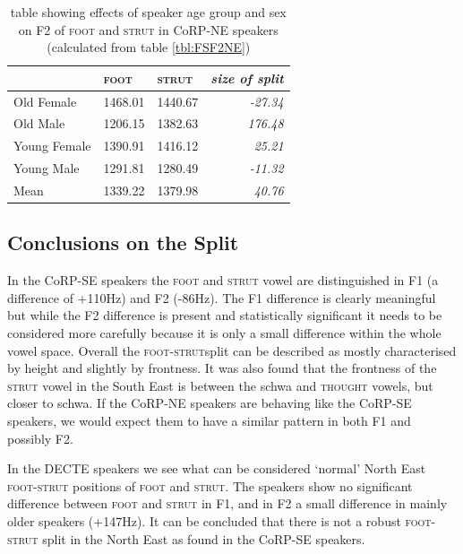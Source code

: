 \documentclass[12pt,a4paper,notitlepage,
bibliography=totoc,
numbers=endperiod,
appendixprefix=true,
usenames,dvipsnames]{scrartcl}
\let\Oldsubsection\subsection
\renewcommand{\subsection}{\FloatBarrier\Oldsubsection}
\newcommand{\quotesingle}[1]{`#1'}
\newcommand{\scs}{\textsc}
\newcommand{\foot}{\scs{foot}}
\newcommand{\strutt}{\scs{strut}}
\newcommand{\FS}{\scs{foot}-\scs{strut}}
\begin{document}


\begin{table}[htbp]
	\centering
	\begin{tabular}{lrrr}
		\hline
		& \multicolumn{1}{l}{\foot{}} & \multicolumn{1}{l}{\strutt{}} & \multicolumn{1}{l}{\textit{size of split}} \\
		\hline
		Old Female & 1468.01 & 1440.67 & \textit{-27.34} \\
		Old Male & 1206.15 & 1382.63 & \textit{176.48} \\
		Young Female & 1390.91 & 1416.12 & \textit{25.21} \\
		Young Male & 1291.81 & 1280.49 & \textit{-11.32} \\
		Mean  & 1339.22 & 1379.98 & \textit{40.76} \\
		\hline
	\end{tabular}%
	\caption{table showing effects of speaker age group and sex on F2 of \foot{} and \strutt{} in CoRP-NE speakers (calculated from table \ref{tbl:FSF2NE})}
	\label{tbl:FSF2NEinter}
	\end{table}%


\subsection{Conclusions on the Split}
In the CoRP-SE speakers the \foot{} and \strutt{} vowel are distinguished in F1 (a difference of +110Hz) and F2 (-86Hz). The F1 difference is clearly meaningful but while the F2 difference is present and statistically significant it needs to be considered more carefully because it is only a small difference within the whole vowel space. Overall the \FS split can be described as mostly characterised by height and slightly by frontness. It was also found that the frontness of the \strutt{} vowel in the South East is between the schwa and \scs{thought} vowels, but closer to schwa. If the CoRP-NE speakers are behaving like the CoRP-SE speakers, we would expect them to have a similar pattern in both F1 and possibly F2.

In the DECTE speakers we see what can be considered \quotesingle{normal} North East \FS{} positions of \foot{} and \strutt{}. The speakers show no significant difference between \foot{} and \strutt{} in F1, and in F2 a small difference in mainly older speakers (+147Hz). It can be concluded that there is not a robust \FS{} split in the North East as found in the CoRP-SE speakers.
\end{document}

